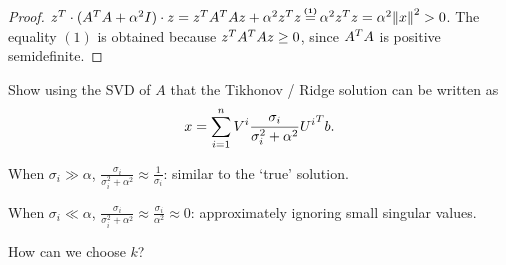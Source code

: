 \documentclass[ComputationalMathematics.tex]{subfiles}
\begin{document}
\begin{proof}
  $\tr{z} \cdot (\tr{A}A + \alpha^2 I) \cdot z = \tr{z}\tr{A}Az + \alpha^2 \tr{z} z  \numeq{(1)} \alpha^2 \tr{z} z = \alpha^2 \sqrnorm{x} > 0$. The equality $(1)$ is obtained because ${z}^{T}{A}^{T}Az \ge 0$, since ${A}^{T}A$ is positive semidefinite. 
\end{proof}

\begin{exe}
Show using the SVD of $A$ that the Tikhonov / Ridge solution can be written as
\[
  x = \sum\limits_{i=1}^n V^i \frac{\sigma_i}{\sigma_i^2+\alpha^2} {U^i}^{T} b.
\]

When $\sigma_i \gg \alpha$, $\frac{\sigma_i}{\sigma_i^2+\alpha^2} \approx \frac{1}{\sigma_i}$: similar to the `true' solution.

When $\sigma_i \ll \alpha$, $\frac{\sigma_i}{\sigma_i^2+\alpha^2} \approx \frac{\sigma_i}{\alpha^2} \approx 0$: approximately ignoring small singular values.
\end{exe}
How can we choose $k$?

\end{document}
